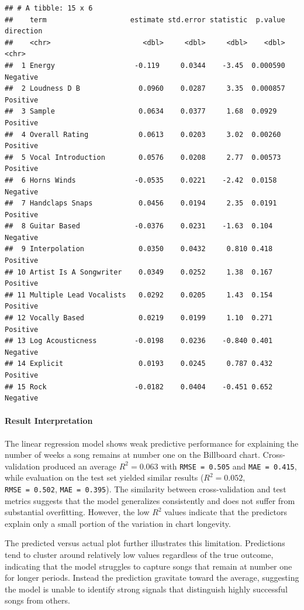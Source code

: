 \documentclass[
]{article}
\begin{document}
\begin{verbatim}
## # A tibble: 15 x 6
##    term                    estimate std.error statistic  p.value direction
##    <chr>                      <dbl>     <dbl>     <dbl>    <dbl> <chr>    
##  1 Energy                   -0.119     0.0344    -3.45  0.000590 Negative 
##  2 Loudness D B              0.0960    0.0287     3.35  0.000857 Positive 
##  3 Sample                    0.0634    0.0377     1.68  0.0929   Positive 
##  4 Overall Rating            0.0613    0.0203     3.02  0.00260  Positive 
##  5 Vocal Introduction        0.0576    0.0208     2.77  0.00573  Positive 
##  6 Horns Winds              -0.0535    0.0221    -2.42  0.0158   Negative 
##  7 Handclaps Snaps           0.0456    0.0194     2.35  0.0191   Positive 
##  8 Guitar Based             -0.0376    0.0231    -1.63  0.104    Negative 
##  9 Interpolation             0.0350    0.0432     0.810 0.418    Positive 
## 10 Artist Is A Songwriter    0.0349    0.0252     1.38  0.167    Positive 
## 11 Multiple Lead Vocalists   0.0292    0.0205     1.43  0.154    Positive 
## 12 Vocally Based             0.0219    0.0199     1.10  0.271    Positive 
## 13 Log Acousticness         -0.0198    0.0236    -0.840 0.401    Negative 
## 14 Explicit                  0.0193    0.0245     0.787 0.432    Positive 
## 15 Rock                     -0.0182    0.0404    -0.451 0.652    Negative
\end{verbatim}

\paragraph{Result Interpretation}\label{result-interpretation}

The linear regression model shows weak predictive performance for
explaining the number of weeks a song remains at number one on the
Billboard chart. Cross-validation produced an average \(R^2 = 0.063\)
with \texttt{RMSE\ =\ 0.505} and \texttt{MAE\ =\ 0.415}, while
evaluation on the test set yielded similar results (\(R^2 = 0.052\),
\texttt{RMSE\ =\ 0.502}, \texttt{MAE\ =\ 0.395}). The similarity between
cross-validation and test metrics suggests that the model generalizes
consistently and does not suffer from substantial overfitting. However,
the low \(R^2\) values indicate that the predictors explain only a small
portion of the variation in chart longevity.

The predicted versus actual plot further illustrates this limitation.
Predictions tend to cluster around relatively low values regardless of
the true outcome, indicating that the model struggles to capture songs
that remain at number one for longer periods. Instead the prediction
gravitate toward the average, suggesting the model is unable to identify
strong signals that distinguish highly successful songs from others.
\end{document}
